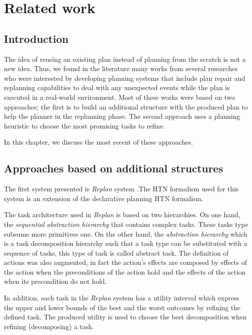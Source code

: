 \chapter{Related work} %

\label{Chapter 3} %



\section{Introduction}
\par The idea of reusing an existing plan instead of planning from the scratch is not a new idea. Thus, we found in the literature many works from several researches who were interested by developing planning systems that include plan repair and replanning capabilities to deal with any unexpected events while the plan is executed in a real-world environment. Most of these works were based on two approaches; the first is to build an additional structure with the produced plan to help the planner in the replanning phase. The second approach uses a planning heuristic to choose the most promising tasks to refine. 

In this chapter, we discuss the most recent of these approaches. 
\section{Approaches based on additional structures}
\par The first system presented is \textit{Replan} system \cite{boella2002replanning}.The HTN formalism used for this system is an extension of the declarative planning HTN formalism. 

The task architecture used in \textit{Replan} is based on two hierarchies. On one hand, the \textit{sequential abstraction hierarchy} that contains complex tasks. These tasks type subsume more primitives one. On the other hand, the\textit{ abstraction hierarchy }which is a task decomposition hierarchy such that a task type can be substituted with a sequence of tasks, this type of task is called abstract task. The definition of actions was also augmented, in fact the action’s effects are composed by effects of the action when the preconditions of the action hold and the effects of the action when its precondition do not hold. 

In addition, each task in the \textit{Replan} system has a utility interval which express the upper and lower bounds of the best and the worst outcomes by refining the defined task. The produced utility is used to choose the best decomposition when refining (decomposing) a task.


